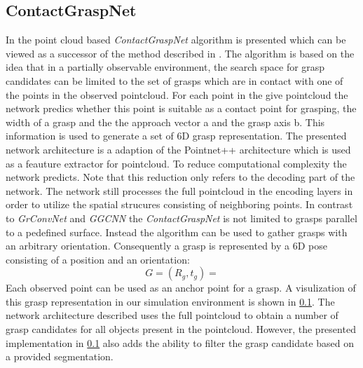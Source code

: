\subsection{ContactGraspNet}
In \cite{sundermeyer2021contact} the point cloud based \textit{ContactGraspNet} algorithm is presented which can be viewed as a successor of the method described in \cite{}.
The algorithm is based on the idea that in a partially observable environment, the search space for grasp candidates can be limited to the set of grasps which are
in contact with one of the points in the observed pointcloud.
For each point in the give pointcloud the network predics whether this point is suitable as a contact point for grasping, the width of a grasp and the the approach vector a and the grasp axis b.
This information is used to generate a set of 6D grasp representation.
The presented network architecture is a adaption of the Pointnet++ architecture \cite{qi2017pointnet++} which is used as a feauture extractor for pointcloud.
To reduce computational complexity the network predicts.
Note that this reduction only refers to the decoding part of the network. The network still processes the full pointcloud in the encoding layers in order to
utilize the spatial strucures consisting of neighboring points.
In contrast to \textit{GrConvNet} and \textit{GGCNN} the \textit{ContactGraspNet} is not limited to grasps parallel to a pedefined surface.
Instead the algorithm can be used to gather grasps with an arbitrary orientation.
Consequently a grasp is represented by a 6D pose consisting of a position and an orientation:
$$ G = (R_g, t_g) = $$
Each observed point can be used as an anchor point for a grasp.
A visulization of this grasp representation in our simulation environment is shown in \ref{}.
The network architecture described uses the full pointcloud to obtain a number of grasp candidates for all objects present in the pointcloud.
However, the presented implementation in \ref{} also adds the ability to filter the grasp candidate based on a provided segmentation.


